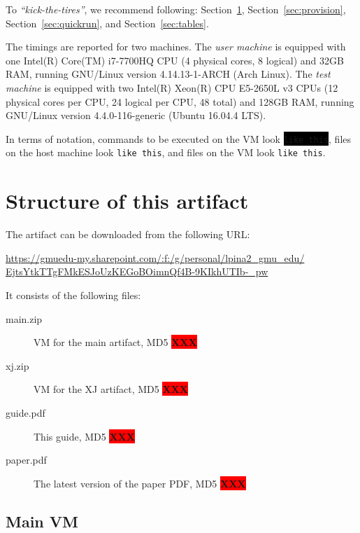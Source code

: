 \documentclass[12pt]{article}
\newcommand{\command}[1]{\colorbox{black}{\texttt{\color{white}#1}}}
\newcommand{\host}[1]{\colorbox{blue!20}{\texttt{\color{black}#1}}}
\newcommand{\vm}[1]{\colorbox{green!20}{\texttt{\color{black}#1}}}
\newcommand{\XXX}{\colorbox{red}{\bf\color{white}XXX}}
\begin{document}
To \emph{``kick-the-tires''}, we recommend following:
Section~\ref{sec:structure}, Section~\ref{sec:provision},
Section~\ref{sec:quickrun}, and Section~\ref{sec:tables}.

The timings are reported for two machines.  The \emph{user machine} is equipped
with one Intel(R) Core(TM) i7-7700HQ CPU (4 physical cores, 8 logical) and 32GB
RAM, running GNU/Linux version 4.14.13-1-ARCH (Arch Linux).  The \emph{test
machine} is equipped with two Intel(R) Xeon(R) CPU E5-2650L v3 CPUs (12 physical
cores per CPU, 24 logical per CPU, 48 total) and 128GB RAM, running GNU/Linux
version 4.4.0-116-generic (Ubuntu 16.04.4 LTS).

In terms of notation, commands to be executed on the VM look \command{like
this}, files on the host machine look \host{like this}, and files on the VM look
\vm{like this}.

\section{Structure of this artifact}
\label{sec:structure}

The artifact can be downloaded from the following URL:

\href{https://gmuedu-my.sharepoint.com/:f:/g/personal/lpina2_gmu_edu/EjtsYtkTTgFMkESJoUzKEGoBOimnQf4B-9KIkhUTIb-_pw}{https://gmuedu-my.sharepoint.com/:f:/g/personal/lpina2\_gmu\_edu/\\EjtsYtkTTgFMkESJoUzKEGoBOimnQf4B-9KIkhUTIb-\_pw}

It consists of the following files:

\begin{description}

    \item[main.zip] VM for the main artifact, MD5 \XXX

    \item[xj.zip] VM for the XJ artifact, MD5 \XXX

    \item[guide.pdf] This guide, MD5 \XXX

    \item[paper.pdf] The latest version of the paper PDF, MD5 \XXX

\end{description}


\subsection{Main VM}
\label{sec:main}
\end{document}
